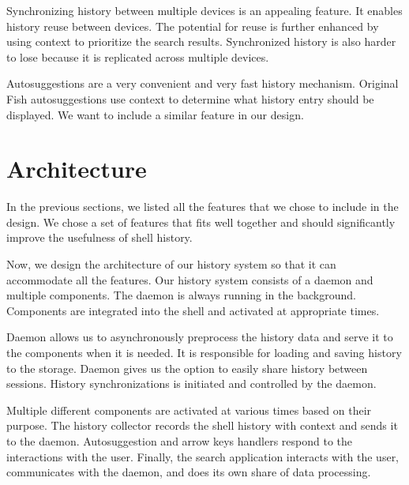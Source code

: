 Synchronizing history between multiple devices is an appealing feature. It enables history reuse between devices. The potential for reuse is further enhanced by using context to prioritize the search results.
Synchronized history is also harder to lose because it is replicated across multiple devices. 


Autosuggestions are a very convenient and very fast history mechanism. Original Fish autosuggestions use context to determine what history entry should be displayed.
We want to include a similar feature in our design.

\newpage
\section{Architecture}

In the previous sections, we listed all the features that we chose to include in the design. We chose a set of features that fits well together and should significantly improve the usefulness of shell history.

Now, we design the architecture of our history system so that it can accommodate all the features. 
Our history system consists of a daemon and multiple components. The daemon is always running in the background. Components are integrated into the shell and activated at appropriate times. 


Daemon allows us to asynchronously preprocess the history data and serve it to the components when it is needed. It is responsible for loading and saving history to the storage. Daemon gives us the option to easily share history between sessions. History synchronizations is initiated and controlled by the daemon.


Multiple different components are activated at various times based on their purpose. The history collector records the shell history with context and sends it to the daemon. Autosuggestion and arrow keys handlers respond to the interactions with the user. Finally, the search application interacts with the user, communicates with the daemon, and does its own share of data processing.


